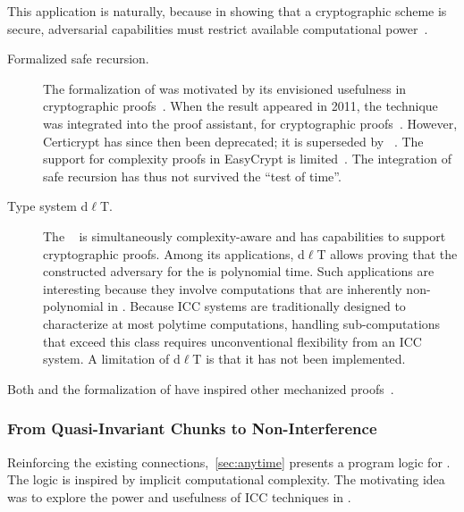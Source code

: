 This application is naturally, because in showing that a cryptographic scheme is secure, adversarial capabilities must restrict available computational power~\cite{heraud2011}.

\begin{description}

\item[Formalized safe recursion.]
The formalization of  was motivated by its envisioned
usefulness in cryptographic proofs~\cite{heraud2011}. When
the result appeared in 2011, the technique was integrated into the
\href{https://github.com/EasyCrypt/certicrypt} {} proof
assistant, for cryptographic proofs~\cite{barthe2009}. However, Certicrypt has
since then been deprecated; it is superseded by
~\cite{barthe2014}. The support for complexity proofs in
EasyCrypt is limited~\cite{barbosa2023}. The integration of safe recursion has
thus not survived the \enquote{test of time}.

\item[Type system d\(\ell\)T.]
The  ~\cite{baillot2015,baillot2019} is
simultaneously complexity-aware and has capabilities to support cryptographic
proofs. Among its applications, d\(\ell\)T allows proving
that the constructed adversary for the  is
polynomial time. Such applications are interesting because they involve
computations that are inherently non-polynomial in .
Because ICC systems are traditionally designed to characterize at most polytime
computations, handling sub-computations that exceed this class requires
unconventional flexibility from an ICC system. A limitation of d\(\ell\)T is
that it has not been implemented.

\end{description}

Both  and the formalization of  have
inspired other mechanized proofs~\cite{barbosa2021,feree2018}.

\subsubsection{From Quasi-Invariant Chunks to Non-Interference}
\label{subsubsec:quasi-ni}

Reinforcing the existing connections,~\autoref{sec:anytime} presents a program
logic for . The logic is inspired by implicit
computational complexity. The motivating idea was to explore the power and
usefulness of ICC techniques in .

